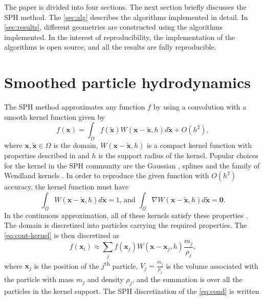 \documentclass[preprint,12pt]{elsarticle}
\newcommand{\ten}[1]{\ensuremath{\mathbf{#1}}}
\begin{document}
The paper is divided into four sections. The next section briefly discusses
the SPH method. The \cref{sec:alg} describes the algorithms implemented in
detail. In \cref{sec:results}, different geometries are constructed using the
algorithms implemented. In the interest of reproducibility, the implementation
of the algorithms is open source, and all the results are fully reproducible.

\section{Smoothed particle hydrodynamics}
\label{sec:sph}

The SPH method approximates any function $f$ by using a convolution
with a smooth kernel function given by
\begin{equation}
  f(\ten{x}) = \int_{\Omega} f(\tilde{\ten{x}})
  W(\ten{x} - \tilde{\ten{x}}, h) d \tilde{\ten{x}} + O(h^2),
  \label{eq:cont-kernel}
\end{equation}
where $ \ten{x}, \tilde{\ten{x}} \in \Omega$ is the domain, $W(\ten{x} -
\tilde{\ten{x}}, h)$ is a compact kernel function with properties described
in \cite{monaghan-review:2005} and $h$ is the support radius of the kernel.
Popular choices for the kernel in the SPH community are the Gaussian
\cite{monaghan-review:2005}, splines \cite{sph:fsf:monaghan-jcp94} and the
family of Wendland kernels \cite{wendland1995piecewise}. In order to
reproduce the given function with $O(h^2)$ accuracy, the kernel function must
have
\begin{equation}
  \int_{\Omega} W(\ten{x} - \tilde{\ten{x}}, h) d \tilde{\ten{x}} = 1
  \text{, and }
  \int_{\Omega} \nabla W(\ten{x} - \tilde{\ten{x}}, h) d \tilde{\ten{x}} = \ten{0}.
  \label{eq:cond}
\end{equation}
In the continuous approximation, all of these kernels satisfy these
properties \cite{sph:basa-etal-2009}. The domain is discretized into
particles carrying the required properties. The \cref{eq:cont-kernel} is then
discretized as
\begin{equation}
  f(\ten{x}_i) \approx \sum_{j} f(\ten{x}_j)  W(\ten{x} - \ten{x}_j, h) \frac{m_j}{\rho_j},
  \label{eq:disc-kernel}
\end{equation}
where $\ten{x}_j$ is the position of the $j$\textsuperscript{th} particle,
$V_j = \frac{m_j}{\rho_j}$ is the volume associated with the particle with
mass $m_j$ and density $\rho_j$, and the summation is over all the particles
in the kernel support. The SPH discretization of the \cref{eq:cond} is written
\end{document}
